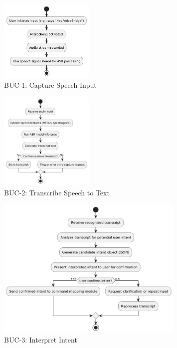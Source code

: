 \documentclass[11pt]{article}
\begin{document}
\begin{figure}[H]
\centering
\includegraphics[width=0.4\textwidth]{../imgs/BUC1.png}
\caption{BUC-1: Capture Speech Input}
\label{fig:buc1}
\end{figure}

\begin{figure}[H]
\centering
\includegraphics[width=0.4\textwidth]{../imgs/BUC2.png}
\caption{BUC-2: Transcribe Speech to Text}
\label{fig:buc2}
\end{figure}

\begin{figure}[H]
\centering
\includegraphics[width=0.8\textwidth]{../imgs/BUC3.png}
\caption{BUC-3: Interpret Intent}
\label{fig:buc3}
\end{figure}
\end{document}
